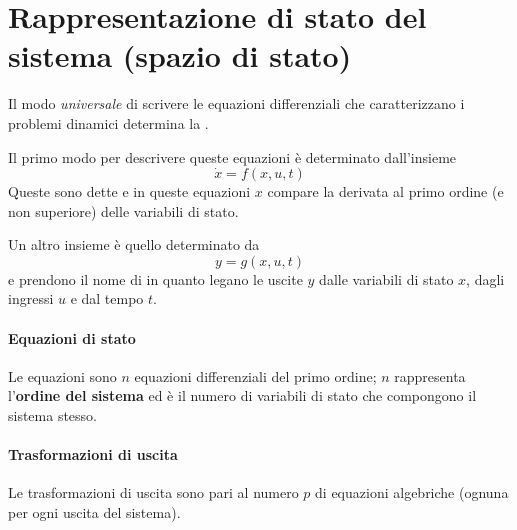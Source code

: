 \section{Rappresentazione di stato del sistema (spazio di stato)}
	Il modo \textit{universale} di scrivere le equazioni differenziali che caratterizzano i problemi dinamici determina la .
	
	\vspace{3mm}
	Il primo modo per descrivere queste equazioni è determinato dall'insieme
	\[ \dot x = f(x,u,t) \]
	Queste sono dette  e in queste equazioni $x$ compare la derivata al primo ordine (e non superiore) delle variabili di stato. 
	
	Un altro insieme è quello determinato da
	\[y = g(x,u,t)\]
	e prendono il nome di  in quanto legano le uscite $y$ dalle variabili di stato $x$, dagli ingressi $u$ e dal tempo $t$.
	
	\paragraph{Equazioni di stato} Le equazioni sono $n$ equazioni differenziali del primo ordine; $n$ rappresenta l'\textbf{ordine del sistema} ed è il numero di variabili di stato che compongono il sistema stesso.
	
	\paragraph{Trasformazioni di uscita} Le trasformazioni di uscita sono pari al numero $p$ di equazioni algebriche (ognuna per ogni uscita del sistema).
	
